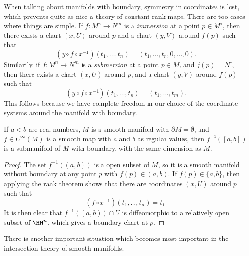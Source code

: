 When talking about manifolds with boundary, symmetry in coordinates is lost, which prevents quite as nice a theory of constant rank maps. There are too cases where things are simple. If $f: M^n \to N^m$ is a \emph{immersion} at a point $p \in M^\circ$, then there exists a chart $(x,U)$ around $p$ and a chart $(y,V)$ around $f(p)$ such that
%
\[ (y \circ f \circ x^{-1})(t_1, \dots, t_n) = (t_1, \dots, t_n, 0, \dots, 0). \]
%
Similarily, if $f: M^n \to N^m$ is a \emph{submersion} at a point $p \in M$, and $f(p) = N^\circ$, then there exists a chart $(x,U)$ around $p$, and a chart $(y,V)$ around $f(p)$ such that
%
\[ (y \circ f \circ x^{-1})(t_1, \dots, t_n) = (t_1, \dots, t_m). \]
%
This follows because we have complete freedom in our choice of the coordinate systems around the manifold with boundary.

\begin{theorem}
    If $a < b$ are real numbers, $M$ is a smooth manifold with $\partial M = \emptyset$, and $f \in C^\infty(M)$ is a smooth map with $a$ and $b$ as regular values, then $f^{-1}([a,b])$ is a submanifold of $M$ with boundary, with the same dimension as $M$.
\end{theorem}
\begin{proof}
    The set $f^{-1}((a,b))$ is a open subset of $M$, so it is a smooth manifold without boundary at any point $p$ with $f(p) \in (a,b)$. If $f(p) \in \{ a, b \}$, then applying the rank theorem shows that there are coordinates $(x,U)$ around $p$ such that
    \[ (f \circ x^{-1})(t_1, \dots, t_n) = t_1. \]
    It is then clear that $f^{-1}((a,b)) \cap U$ is diffeomorphic to a relatively open subset of $\HH^n$, which gives a boundary chart at $p$.
\end{proof}

There is another important situation which becomes most important in the intersection theory of smooth manifolds.

